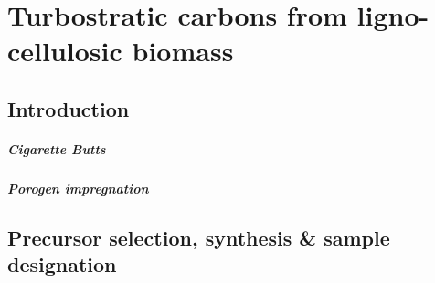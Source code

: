 \chapter{Turbostratic carbons from ligno-cellulosic biomass}
\label{ch:syntheses}

\newpage

\section{Introduction}

\paragraph{Cigarette Butts}

\paragraph{Porogen impregnation}

\section{Precursor selection, synthesis \& sample designation}

